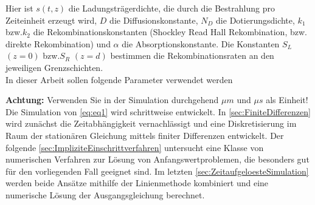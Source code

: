 \documentclass[
	pagesize,
	fontsize=12pt,
	paper=a4,
	oneside,
   reqno
]{scrartcl}
\begin{document}
Hier ist $s(t,z)$ die Ladungsträgerdichte, die durch die Bestrahlung pro Zeiteinheit erzeugt wird, $D$ die Diffusionskonstante, $N_D$ die Dotierungsdichte, $k_1$ bzw.\xspace $k_2$ die Rekombinationskonstanten (Shockley Read Hall Rekombination, bzw.\xspace direkte Rekombination) und $\alpha$ die Absorptionskonstante. Die Konstanten $S_L$ $(z = 0)$ bzw.\xspace $S_R$ $(z = d)$ bestimmen die Rekombinationsraten an den jeweiligen Grenzschichten. \\

In dieser Arbeit sollen folgende Parameter verwendet werden

\begin{table}[H]
   \centering
   \caption{Verwendete Parameter}
   \label{tab:Tabelle1}
\end{table}

\textbf{Achtung:} Verwenden Sie in der Simulation durchgehend $\mu m$ und $\mu s$ als Einheit! \\

Die Simulation von \autoref{eq:eq1} wird schrittweise entwickelt. In \autoref{sec:FiniteDifferenzen} wird zunächst die Zeitabhängigkeit vernachlässigt und eine Diskretisierung im Raum der stationären Gleichung mittels finiter Differenzen entwickelt. Der folgende \autoref{sec:ImpliziteEinschrittverfahren} untersucht eine Klasse von numerischen Verfahren zur Lösung von Anfangswertproblemen, die besonders gut für den vorliegenden Fall geeignet sind. Im letzten \autoref{sec:ZeitaufgeloesteSimulation} werden beide Ansätze mithilfe der Linienmethode kombiniert und eine numerische Lösung der Ausgangsgleichung berechnet.
\end{document}

